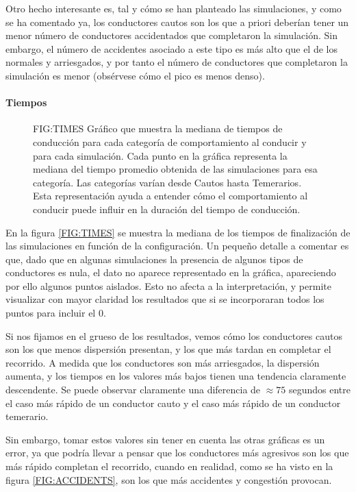 Otro hecho interesante es, tal y cómo se han planteado las simulaciones, y como se ha comentado ya, los conductores
cautos son los que a priori deberían tener un menor número de conductores accidentados que completaron la simulación. 
Sin embargo, el número de accidentes asociado a este tipo es más alto que el de los normales y arriesgados,
y por tanto el número de conductores que completaron la simulación es menor (obsérvese cómo el pico es menos denso).

\paragraph{Tiempos}

\begin{figure}[Mediana de tiempos de finalización en función de la configuración.]{FIG:TIMES}{
    Gráfico que muestra la mediana de tiempos de conducción para cada categoría de comportamiento al conducir y para cada simulación.
    Cada punto en la gráfica representa la mediana del tiempo promedio obtenida de las simulaciones para esa categoría.
    Las categorías varían desde Cautos hasta Temerarios. Esta representación ayuda a entender cómo el comportamiento al conducir puede influir
    en la duración del tiempo de conducción.
    }
\end{figure}

En la figura \ref{FIG:TIMES} se muestra la mediana de los tiempos de finalización de las simulaciones en función de la configuración.
Un pequeño detalle a comentar es que, dado que en algunas simulaciones la presencia de algunos tipos de conductores es nula,
el dato no aparece representado en la gráfica, apareciendo por ello algunos puntos aislados. Esto no afecta a la interpretación,
y permite visualizar con mayor claridad los resultados que si se incorporaran todos los puntos para incluir el $0$.

Si nos fijamos en el grueso de los resultados, vemos cómo los conductores cautos son los que menos dispersión presentan, y los
que más tardan en completar el recorrido. A medida que los conductores son más arriesgados, la dispersión aumenta, y los tiempos
en los valores más bajos tienen una tendencia claramente descendente. Se puede observar claramente una diferencia de $\approx 75$
segundos entre el caso más rápido de un conductor cauto y el caso más rápido de un conductor temerario.

Sin embargo, tomar estos valores sin tener en cuenta las otras gráficas es un error, ya que podría llevar a pensar que
los conductores más agresivos son los que más rápido completan el recorrido, cuando en realidad, como se ha visto en la figura \ref{FIG:ACCIDENTS},
son los que más accidentes y congestión provocan.
